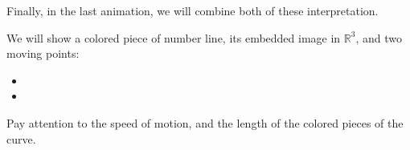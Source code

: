 \documentclass[aspectratio=169]{beamer}
\begin{document}
\begin{frame}
    Finally, in the last animation, we will combine both of these
    interpretation.\pause

    We will show a colored piece of number line, its embedded image in
    $\mathbb{R}^3$, and two moving points:
    \begin{itemize}
        \item \color{green}{one along the number line, representing the time
                $t$}
        \item \color{blue}{one along the embedded curve, representing the
                moving object}
    \end{itemize}\pause

    Pay attention to the speed of motion, and the length of the colored pieces
    of the curve.
\end{frame}
\end{document}
